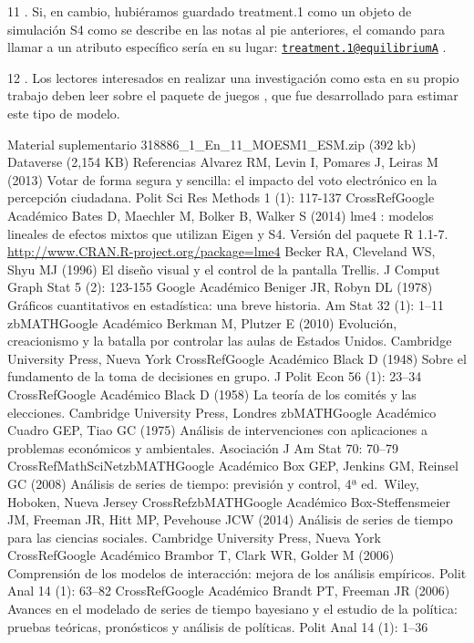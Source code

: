 \documentclass[
]{book}
\begin{document}
11 .
Si, en cambio, hubiéramos guardado treatment.1 como un objeto de simulación S4 como se describe en las notas al pie anteriores, el comando para llamar a un atributo específico sería en su lugar: \href{mailto:treatment.1@equilibriumA}{\nolinkurl{treatment.1@equilibriumA}} .

12 .
Los lectores interesados \hspace{0pt}\hspace{0pt}en realizar una investigación como esta en su propio trabajo deben leer sobre el paquete de juegos , que fue desarrollado para estimar este tipo de modelo.

Material suplementario
318886\_1\_En\_11\_MOESM1\_ESM.zip (392 kb)
Dataverse (2,154 KB)
Referencias
Alvarez RM, Levin I, Pomares J, Leiras M (2013) Votar de forma segura y sencilla: el impacto del voto electrónico en la percepción ciudadana. Polit Sci Res Methods 1 (1): 117-137
CrossRefGoogle Académico
Bates D, Maechler M, Bolker B, Walker S (2014) lme4 : modelos lineales de efectos mixtos que utilizan Eigen y S4. Versión del paquete R 1.1-7. \url{http://www.CRAN.R-project.org/package=lme4}
Becker RA, Cleveland WS, Shyu MJ (1996) El diseño visual y el control de la pantalla Trellis. J Comput Graph Stat 5 (2): 123-155
Google Académico
Beniger JR, Robyn DL (1978) Gráficos cuantitativos en estadística: una breve historia. Am Stat 32 (1): 1--11
zbMATHGoogle Académico
Berkman M, Plutzer E (2010) Evolución, creacionismo y la batalla por controlar las aulas de Estados Unidos. Cambridge University Press, Nueva York
CrossRefGoogle Académico
Black D (1948) Sobre el fundamento de la toma de decisiones en grupo. J Polit Econ 56 (1): 23--34
CrossRefGoogle Académico
Black D (1958) La teoría de los comités y las elecciones. Cambridge University Press, Londres
zbMATHGoogle Académico
Cuadro GEP, Tiao GC (1975) Análisis de intervenciones con aplicaciones a problemas económicos y ambientales. Asociación J Am Stat 70: 70--79
CrossRefMathSciNetzbMATHGoogle Académico
Box GEP, Jenkins GM, Reinsel GC (2008) Análisis de series de tiempo: previsión y control, 4ª ed.~Wiley, Hoboken, Nueva Jersey
CrossRefzbMATHGoogle Académico
Box-Steffensmeier JM, Freeman JR, Hitt MP, Pevehouse JCW (2014) Análisis de series de tiempo para las ciencias sociales. Cambridge University Press, Nueva York
CrossRefGoogle Académico
Brambor T, Clark WR, Golder M (2006) Comprensión de los modelos de interacción: mejora de los análisis empíricos. Polit Anal 14 (1): 63--82
CrossRefGoogle Académico
Brandt PT, Freeman JR (2006) Avances en el modelado de series de tiempo bayesiano y el estudio de la política: pruebas teóricas, pronósticos y análisis de políticas. Polit Anal 14 (1): 1--36
\end{document}
